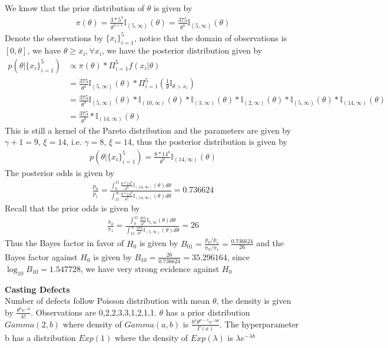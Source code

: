 \documentclass{homeworg}
\begin{document}
We know that the prior distribution of $\theta$ is given by 
\begin{align*}
\pi(\theta)=\frac{3*5^3}{\theta^{3+1}}\mathbb{I}_{(5,\infty)}(\theta)=
\frac{375}{\theta^4}\mathbb{I}_{(5,\infty)}(\theta)
\end{align*}
Denote the observations by $\{x_i\}_{i=1}^5$, notice that the domain of observations is $[0,\theta]$,  we have $\theta\geq x_i, \forall x_i$, we have the posterior distribution given by 
\begin{align*}
p(\theta|\{x_i\}_{i=1}^5)&\propto \pi(\theta)*\Pi_{i=1}^5f(x_i|\theta)\\
&=\frac{375}{\theta^4}\mathbb{I}_{(5,\infty)}(\theta)*\Pi_{i=1}^5(\frac{1}{\theta}\mathbb{I}_{\theta>x_i})\\
&=\frac{375}{\theta^9}\mathbb{I}_{(5,\infty)}(\theta)*\mathbb{I}_{(10,\infty)}(\theta)*\mathbb{I}_{(3,\infty)}(\theta)*\mathbb{I}_{(2,\infty)}(\theta)*\mathbb{I}_{(5,\infty)}(\theta)*\mathbb{I}_{(14,\infty)}(\theta)\\
&=\frac{375}{\theta^9}*\mathbb{I}_{(14,\infty)}(\theta)
\end{align*}
This is still a kernel of the Pareto distribution and the parameters are given by $\gamma+1=9$, $\xi=14$, i.e. $\gamma=8$, $\xi=14$, thus the posterior distribution is given by 
\begin{align*}
p(\theta|\{x_i\}_{i=1}^5)=\frac{8*14^8}{\theta^9}\mathbb{I}_{(14,\infty)}(\theta)
\end{align*}
The posterior odds is given by 
\begin{align*}
\frac{p_0}{p_1}=\frac{\int_{0}^{15}\frac{8*14^8}{\theta^9}\mathbb{I}_{(14,\infty)}(\theta)d\theta}{\int_{15}^{\infty}\frac{8*14^8}{\theta^9}\mathbb{I}_{(14,\infty)}(\theta)d\theta}=0.736624
\end{align*}
Recall that the prior odds is given by 
\begin{align*}
\frac{\pi_0}{\pi_1}=\frac{\int_{0}^{15}\frac{375}{\theta^4}\mathbb{I}_{5,\infty}(\theta)d\theta}{\int_{15}^{\infty}\frac{375}{\theta^4}\mathbb{I}_{(5,\infty)}(\theta)d\theta}=26
\end{align*}
Thus the Bayes factor in favor of $H_0$ is given by $B_{01}=\frac{p_0/p_1}{\pi_0/\pi_1}=\frac{0.736624}{26}$ and the Bayes factor against $H_0$ is given by $B_{10}=\frac{26}{0.736624}=35.296164$, since $\log_{10}B_{10}=1.547728$, we have very strong evidence against $H_0$

\exercise 
\textbf{Casting Defects} \\
Number of defects follow Poisson distribution with mean $\theta$, the density is given by $\frac{\theta^ke^{-\theta}}{k!}$. Observations are 0,2,2,3,3,1,2,1,1. $\theta$ has a prior distribution $Gamma(2,b)$ where density of $Gamma(a,b)$ is $\frac{b^a\theta^{a-1}e^{-b\theta}}{\Gamma(a)}$. The hyperparameter b has a distribution $Exp(1)$ where the density of $Exp(\lambda)$ is $\lambda e^{-\lambda b}$
\end{document}
